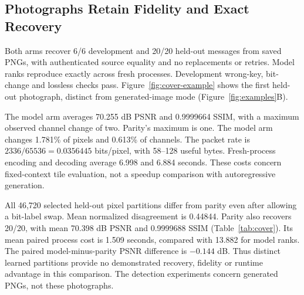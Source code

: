\subsection{Photographs Retain Fidelity and Exact Recovery}
\label{sec:cover-results}
Both arms recover 6/6 development and 20/20 held-out messages from saved PNGs, with authenticated source equality and no replacements or retries. Model ranks reproduce exactly across fresh processes. Development wrong-key, bit-change and lossless checks pass. Figure~\ref{fig:cover-example} shows the first held-out photograph, distinct from generated-image mode (Figure~\ref{fig:examples}B).



\begin{table}[t]
\caption{Photograph evaluation, twenty paired held-out covers per arm. Fidelity and timings are descriptive means. Times include fresh-process startup, loading, graph setup and teardown. The parity baseline has no neural inference. Both arms share each group's packet and positions.}
\label{tab:cover}\centering\small

\end{table}

The model arm averages 70.255 dB PSNR and 0.9999664 SSIM, with a maximum observed channel change of two. Parity's maximum is one. The model arm changes 1.781\% of pixels and 0.613\% of channels. The packet rate is $2336/65536=0.0356445$ bits/pixel, with 58--128 useful bytes. Fresh-process encoding and decoding average 6.998 and 6.884 seconds. These costs concern fixed-context tile evaluation, not a speedup comparison with autoregressive generation.

All 46,720 selected held-out pixel partitions differ from parity even after allowing a bit-label swap. Mean normalized disagreement is 0.44844. Parity also recovers 20/20, with mean 70.398 dB PSNR and 0.9999688 SSIM (Table~\ref{tab:cover}). Its mean paired process cost is 1.509 seconds, compared with 13.882 for model ranks. The paired model-minus-parity PSNR difference is $-0.144$ dB. Thus distinct learned partitions provide no demonstrated recovery, fidelity or runtime advantage in this comparison. The detection experiments concern generated PNGs, not these photographs.
